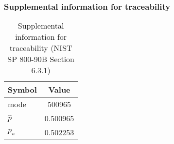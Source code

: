 \documentclass[a3paper,xelatex,english]{bxjsarticle}
\begin{document}
\subsubsection{Supplemental information for traceability}
\renewcommand{\arraystretch}{1.8}
\begin{table}[h]
\caption{Supplemental information for traceability (NIST SP 800-90B Section 6.3.1)}
\begin{center}
\begin{tabular}{|l|c|}
\hline 
\rowcolor{anotherlightblue} %
Symbol				& Value \\ \hline 
mode				&   500965\\ \hline 
$\hat{p}$ 			& 0.500965\\ \hline
$p_u$				& 0.502253\\ \hline
\end{tabular}
\end{center}
\end{table}
\renewcommand{\arraystretch}{1.4}
\clearpage
\end{document}
